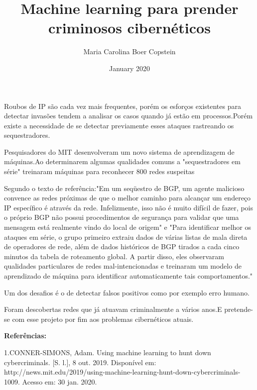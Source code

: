 \documentclass{article}
\title{Machine learning para prender criminosos cibernéticos}
\author{Maria Carolina Boer Copstein}
\date{January 2020}
\begin{document}
\maketitle

\hfill

Roubos de IP são cada vez mais frequentes, porém os esforços existentes para detectar invasões tendem a analisar  os casos quando já estão em processos.Porém existe a necessidade de se detectar previamente esses ataques rastreando os sequestradores.
\hfill

Pesquisadores do MIT desenvolveram um novo sistema de aprendizagem de máquinas.Ao determinarem algumas qualidades comuns a "sequestradores em série" treinaram máquinas para reconhecer 800 redes suspeitas 
\hfill 

Segundo o texto de referência:"Em um seqüestro de BGP, um agente malicioso convence as redes próximas de que o melhor caminho para alcançar um endereço IP específico é através da rede. Infelizmente, isso não é muito difícil de fazer, pois o próprio BGP não possui procedimentos de segurança para validar que uma mensagem está realmente vindo do local de origem" e "Para identificar melhor os ataques em série, o grupo primeiro extraiu dados de várias listas de mala direta de operadores de rede, além de dados históricos de BGP tirados a cada cinco minutos da tabela de roteamento global. A partir disso, eles observaram qualidades particulares de redes mal-intencionadas e treinaram um modelo de aprendizado de máquina para identificar automaticamente tais comportamentos."
\hfill 

Um dos desafios é o de detectar falsos positivos como por exemplo erro humano.

\hfill

Foram descobertas redes que já atuavam criminalmente a vários anos.E pretende-se com esse projeto por fim aos problemas cibernéticos atuais.
\

\hfill 

\textbf{Referências:} \

\hfill

1.CONNER-SIMONS, Adam. Using machine learning to hunt down cybercriminals. [S. l.], 8 out. 2019. Disponível em: http://news.mit.edu/2019/using-machine-learning-hunt-down-cybercriminals-1009. Acesso em: 30 jan. 2020.
\end{document}
